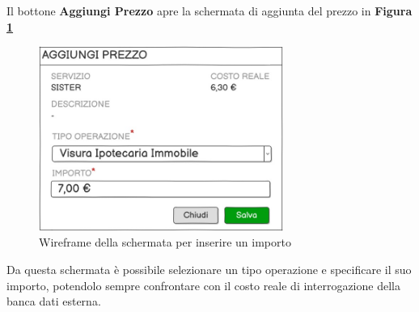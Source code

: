Il bottone \textbf{Aggiungi Prezzo} apre la schermata di aggiunta del prezzo in \textbf{Figura \ref{aggiungiprezzo}}
\begin{figure}[H]
  \centering
  \includegraphics[width=8cm]{images/gestione-listini/aggiungi-prezzo.png}
  \caption{Wireframe della schermata per inserire un importo}
  \label{aggiungiprezzo}
\end{figure}
Da questa schermata \`e possibile selezionare un tipo operazione e specificare il suo importo, potendolo sempre confrontare con il costo reale di interrogazione della banca dati esterna.
